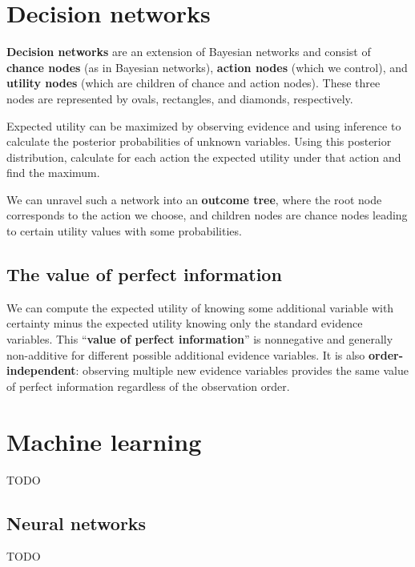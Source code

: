 \documentclass[12pt]{article}
\begin{document}
\section{Decision networks}

\textbf{Decision networks} are an extension of Bayesian networks and consist of \textbf{chance nodes} (as in Bayesian networks), \textbf{action nodes} (which we control), and \textbf{utility nodes} (which are children of chance and action nodes). These three nodes are represented by ovals, rectangles, and diamonds, respectively.

Expected utility can be maximized by observing evidence and using inference to calculate the posterior probabilities of unknown variables. Using this posterior distribution, calculate for each action the expected utility under that action and find the maximum.

We can unravel such a network into an \textbf{outcome tree}, where the root node corresponds to the action we choose, and children nodes are chance nodes leading to certain utility values with some probabilities.

\subsection{The value of perfect information}

We can compute the expected utility of knowing some additional variable with certainty minus the expected utility knowing only the standard evidence variables. This ``\textbf{value of perfect information}'' is nonnegative and generally non-additive for different possible additional evidence variables. It is also \textbf{order-independent}: observing multiple new evidence variables provides the same value of perfect information regardless of the observation order.

\section{Machine learning}

TODO

\subsection{Neural networks}

TODO
\end{document}
